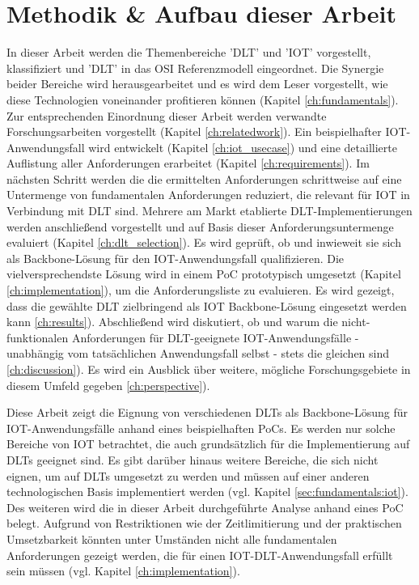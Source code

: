 \section{Methodik \& Aufbau dieser Arbeit}
\label{sec:intro:methodology}
In dieser Arbeit werden die Themenbereiche '\ac{DLT}' und '\ac{IOT}' vorgestellt, klassifiziert und '\ac{DLT}' in das \ac{OSI} Referenzmodell eingeordnet. Die Synergie beider Bereiche wird herausgearbeitet und es wird dem Leser vorgestellt, wie diese Technologien voneinander profitieren können (Kapitel \ref{ch:fundamentals}). Zur entsprechenden Einordnung dieser Arbeit werden verwandte Forschungsarbeiten vorgestellt (Kapitel \ref{ch:relatedwork}). Ein beispielhafter \ac{IOT}-Anwendungsfall wird entwickelt (Kapitel \ref{ch:iot_usecase}) und eine detaillierte Auflistung aller Anforderungen erarbeitet (Kapitel \ref{ch:requirements}). Im nächsten Schritt werden die die ermittelten Anforderungen schrittweise auf eine Untermenge von fundamentalen Anforderungen reduziert, die relevant für \ac{IOT} in Verbindung mit \ac{DLT} sind. Mehrere am Markt etablierte \ac{DLT}-Implementierungen werden anschließend vorgestellt und auf Basis dieser Anforderungsuntermenge evaluiert (Kapitel \ref{ch:dlt_selection}). Es wird geprüft, ob und inwieweit sie sich als Backbone-Lösung für den \ac{IOT}-Anwendungsfall qualifizieren. Die vielversprechendste Lösung wird in einem \ac{PoC} prototypisch umgesetzt (Kapitel \ref{ch:implementation}), um die Anforderungsliste zu evaluieren. Es wird gezeigt, dass die gewählte \ac{DLT} zielbringend als \ac{IOT} Backbone-Lösung eingesetzt werden kann \ref{ch:results}). Abschließend wird diskutiert, ob und warum die nicht-funktionalen Anforderungen für \ac{DLT}-geeignete \ac{IOT}-Anwendungsfälle - unabhängig vom tatsächlichen Anwendungsfall selbst - stets die gleichen sind \ref{ch:discussion}). Es wird ein Ausblick über weitere, mögliche Forschungsgebiete in diesem Umfeld gegeben \ref{ch:perspective}).

Diese Arbeit zeigt die Eignung von verschiedenen \ac{DLT}s als Backbone-Lösung für \ac{IOT}-Anwendungsfälle anhand eines beispielhaften \ac{PoC}s. Es werden nur solche Bereiche von \ac{IOT} betrachtet, die auch grundsätzlich für die Implementierung auf \ac{DLT}s geeignet sind. Es gibt darüber hinaus weitere Bereiche, die sich nicht eignen, um auf \ac{DLT}s umgesetzt zu werden und müssen auf einer anderen technologischen Basis implementiert werden (vgl. Kapitel \ref{sec:fundamentals:iot}). Des weiteren wird die in dieser Arbeit durchgeführte Analyse anhand eines \ac{PoC} belegt. Aufgrund von Restriktionen wie der Zeitlimitierung und der praktischen Umsetzbarkeit könnten unter Umständen nicht alle fundamentalen Anforderungen gezeigt werden, die für einen \ac{IOT}-\ac{DLT}-Anwendungsfall erfüllt sein müssen (vgl. Kapitel \ref{ch:implementation}).
